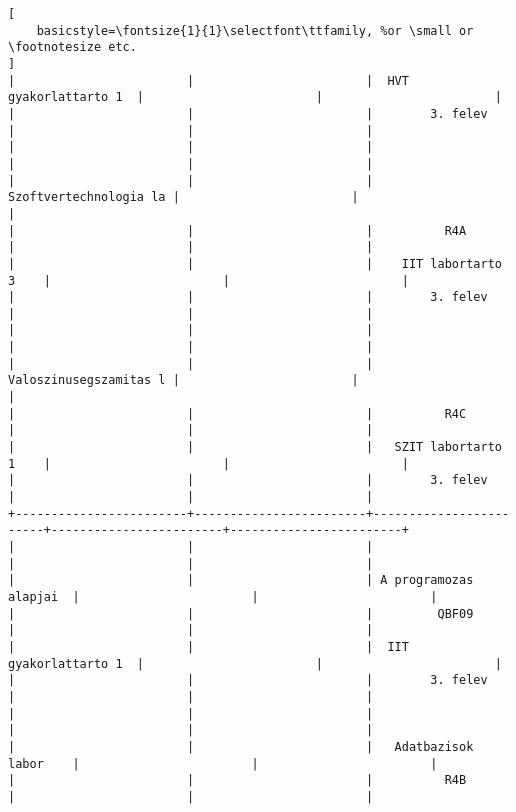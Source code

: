 \begin{lstlisting}[
    basicstyle=\fontsize{1}{1}\selectfont\ttfamily, %or \small or \footnotesize etc.
]
|                        |                        |  HVT gyakorlattarto 1  |                        |                        | 
|                        |                        |        3. felev        |                        |                        | 
|                        |                        |                        |                        |                        | 
|                        |                        | Szoftvertechnologia la |                        |                        | 
|                        |                        |          R4A           |                        |                        | 
|                        |                        |    IIT labortarto 3    |                        |                        | 
|                        |                        |        3. felev        |                        |                        | 
|                        |                        |                        |                        |                        | 
|                        |                        | Valoszinusegszamitas l |                        |                        | 
|                        |                        |          R4C           |                        |                        | 
|                        |                        |   SZIT labortarto 1    |                        |                        | 
|                        |                        |        3. felev        |                        |                        | 
+------------------------+------------------------+------------------------+------------------------+------------------------+
|                        |                        |                        |                        |                        | 
|                        |                        | A programozas alapjai  |                        |                        | 
|                        |                        |         QBF09          |                        |                        | 
|                        |                        |  IIT gyakorlattarto 1  |                        |                        | 
|                        |                        |        3. felev        |                        |                        | 
|                        |                        |                        |                        |                        | 
|                        |                        |   Adatbazisok labor    |                        |                        | 
|                        |                        |          R4B           |                        |                        | 

\end{lstlisting}
